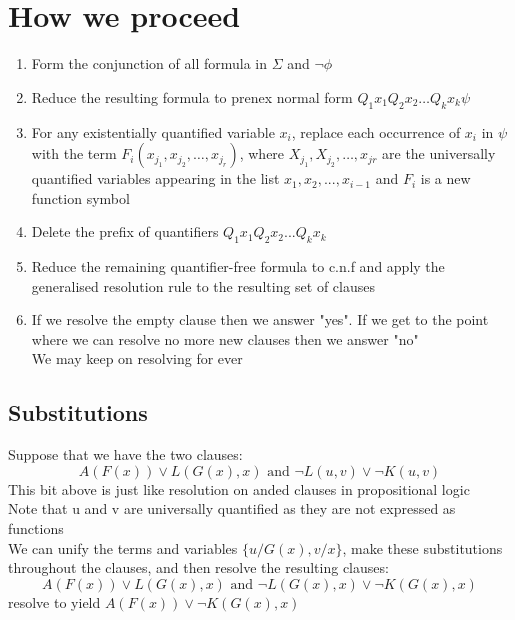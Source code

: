 \documentclass{article}[18pt]
\begin{document}
\section{How we proceed}
\begin{enumerate}
	\item Form the conjunction of all formula in $\Sigma$ and $\lnot\phi$
	\item Reduce the resulting formula to prenex normal form $Q _ { 1 } x _ { 1 } Q _ { 2 } x _ { 2 } \ldots Q _ { k } x _ { k } \psi$
	\item For any existentially quantified variable $x_i$, replace each occurrence of $x_i$ in $\psi$ with the term $F _ { i } \left( x _ { j _ { 1 } } , x _ { j _ { 2 } } , \dots , x _ { j _ { r } } \right)$, where $X _ { j _ { 1 } } , X _ { j _ { 2 } } , \ldots , x _ { j r }$ are the universally quantified variables appearing in the list $x_1,x_2,...,x_{i-1}$ and $F_i$ is a new function symbol
	\item Delete the prefix of quantifiers $Q_1x_1Q_2x_2...Q_kx_k$
	\item Reduce the remaining quantifier-free formula to c.n.f and apply the generalised resolution rule to the resulting set of clauses
	\item If we resolve the empty clause then we answer "yes". If we get to the point where we can resolve no more new clauses then we answer "no"\\
	We may keep on resolving for ever
\end{enumerate}
\subsection{Substitutions}
Suppose that we have the two clauses:
$$A ( F ( x ) ) \vee L ( G ( x ) , x ) \text { and } \neg L ( u , v ) \vee \neg K ( u , v )$$
This bit above is just like resolution on anded clauses in propositional logic\\
Note that u and v are universally quantified as they are not expressed as functions\\
We can unify the terms and variables $\{ u / G ( x ) , v / x \}$, make these substitutions throughout the clauses, and then resolve the resulting clauses:
$$A ( F ( x ) ) \vee L ( G ( x ) , x ) \text { and } \neg L ( G ( x ) , x ) \vee \neg K ( G ( x ) , x )$$
resolve to yield $A ( F ( x ) ) \vee \neg K ( G ( x ) , x )$
\end{document}
